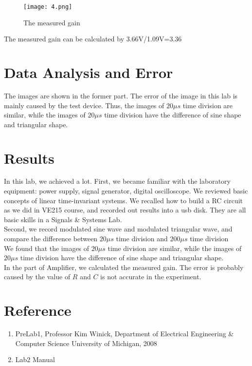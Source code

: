 \documentclass[utf8]{article}
\begin{document}
\begin{figure}[htbp]
	\centering
		\texttt{[image: 4.png]}
		\label{fig-4}
	\caption{The measured gain}
\end{figure}
 The measured gain can be calculated by 3.66V/1.09V=3.36

\section{Data Analysis and Error}
The images are shown in the former part. The error of the image in this lab is mainly caused by the test device. Thus, the images of $20\mu s$ time division are similar, while the images of $20\mu s$ time division have the difference of sine shape and triangular shape.

\section{Results}
In this lab, we achieved a lot.
First, we became familiar with the laboratory equipment: power supply, signal generator, digital oscilloscope. We reviewed basic concepts of linear time-invariant systems. We recalled how to build a RC circuit as we did in VE215 course, and recorded out results into a usb disk. They are all basic skills in a Signals \& Systems Lab.\\

Second, we record modulated sine wave and modulated triangular wave, and compare the difference between $20\mu s$ time division and $200\mu s$ time division\\

We found that the images of $20\mu s$ time division are similar, while the images of $20\mu s$ time division have the difference of sine shape and triangular shape.\\


In the part of Amplifier, we calculated the measured gain. The error is probably caused by the value of $R$ and $C$ is not accurate in the experiment.


\section{Reference}
\begin{enumerate}
	\item PreLab1, Professor Kim Winick, Department of Electrical Engineering \& Computer Science University of Michigan, 2008
	\item Lab2 Manual
\end{enumerate}
\end{document}
